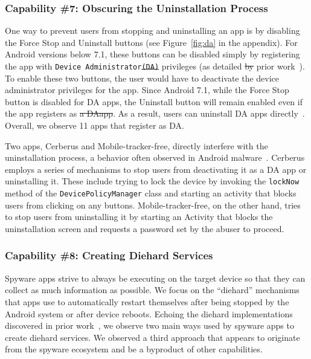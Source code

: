 \documentclass[sigconf,balance=false]{acmart}
\newcommand{\alex}[1]{\textcolor{chicagomaroon}{\noindent[AL: #1]}}
\newcommand{\damon}[1]{\textcolor{blue}{\noindent[DM: #1]}}
\newcommand{\alex}[1]{}
\newcommand{\damon}[1]{}
\providecommand{\DIFadd}[1]{{\protect\color{blue}\uwave{#1}}} %
\providecommand{\DIFdel}[1]{{\protect\color{red}\sout{#1}}}                      %
\providecommand{\DIFaddbegin}{} %
\providecommand{\DIFaddend}{} %
\providecommand{\DIFdelbegin}{} %
\providecommand{\DIFdelend}{} %
\newcommand{\DIFscaledelfig}{0.5}
\newlength{\DIFdelgraphicswidth} %
\newlength{\DIFdelgraphicsheight} %
\newcommand{\DIFaddincludegraphics}[2][]{{\color{blue}\fbox{\DIFOincludegraphics[#1]{#2}}}} %
\newcommand{\DIFdelincludegraphics}[2][]{%
\sbox{\DIFdelgraphicsbox}{\DIFOincludegraphics[#1]{#2}}%
\settoboxwidth{\DIFdelgraphicswidth}{\DIFdelgraphicsbox} %
\settoboxtotalheight{\DIFdelgraphicsheight}{\DIFdelgraphicsbox} %
\scalebox{\DIFscaledelfig}{%
\parbox[b]{\DIFdelgraphicswidth}{\usebox{\DIFdelgraphicsbox}\\[-\baselineskip] \rule{\DIFdelgraphicswidth}{0em}}\llap{\resizebox{\DIFdelgraphicswidth}{\DIFdelgraphicsheight}{%
\setlength{\unitlength}{\DIFdelgraphicswidth}%
\begin{picture}(1,1)%
\thicklines\linethickness{2pt} %
{\color[rgb]{1,0,0}\put(0,0){\framebox(1,1){}}}%
{\color[rgb]{1,0,0}\put(0,0){\line( 1,1){1}}}%
{\color[rgb]{1,0,0}\put(0,1){\line(1,-1){1}}}%
\end{picture}%
}\hspace*{3pt}}} %
} %
\DeclareRobustCommand{\DIFaddbegin}{\DIFOaddbegin \let\includegraphics\DIFaddincludegraphics} %
\DeclareRobustCommand{\DIFaddend}{\DIFOaddend \let\includegraphics\DIFOincludegraphics} %
\DeclareRobustCommand{\DIFdelbegin}{\DIFOdelbegin \let\includegraphics\DIFdelincludegraphics} %
\DeclareRobustCommand{\DIFdelend}{\DIFOaddend \let\includegraphics\DIFOincludegraphics} %
\begin{document}

\subsubsection*{Capability \#7: Obscuring the Uninstallation Process}

One way to prevent users from stopping and uninstalling an app is by
disabling the Force Stop and Uninstall buttons (see
Figure~\ref{fig:da} in the appendix).  For Android versions below 7.1,
these buttons can be disabled simply by registering the app with
\texttt{Device Administrator\DIFdelbegin \DIFdel{(DA)}\DIFdelend } \DIFaddbegin \DIFadd{(DA) }\DIFaddend privileges (as detailed \DIFdelbegin \DIFdel{by }\DIFdelend \DIFaddbegin \DIFadd{in }\DIFaddend prior
work~\cite{shan2019device}). To enable these two buttons, the user
would have to deactivate the device administrator privileges for the
app.
%
Since Android 7.1, while the Force Stop button is disabled for DA
apps, the Uninstall button will remain enabled even if the app
registers as \DIFdelbegin \DIFdel{a DAapp}\DIFdelend \DIFaddbegin \DIFadd{DA}\DIFaddend .  As a result, users can uninstall DA apps
directly~\cite{shan2019device}. Overall, we observe 11 apps that
register as DA.

Two apps, Cerberus and Mobile-tracker-free, directly interfere with the
uninstallation process, a behavior often observed in Android
malware~\cite{shan2019device,aljarrah2016maintaining}. Cerberus employs a series
of mechanisms to stop users from deactivating it as a DA app or
uninstalling it. These include trying to lock the device by invoking the
\texttt{lockNow} method of the \texttt{DevicePolicyManager} class and starting
an activity that blocks users from clicking on any buttons. Mobile-tracker-free,
on the other hand, tries to stop users from uninstalling it by starting an
Activity that blocks the uninstallation screen and requests a password set
by the abuser to proceed.

\subsubsection*{Capability \#8: Creating Diehard Services}
%
Spyware apps strive to always be executing on the target device so
that they can collect as much information as possible.  We focus on
the ``diehard'' mechanisms that apps use to automatically restart
themselves after being stopped by the Android system \DIFaddbegin \DIFadd{(e.g., due to low memory) }\DIFaddend or after device
reboots. Echoing the diehard implementations discovered in prior
work~\cite{shao2019lightweight,zhou2020demystifying}, we observe two
main ways used by spyware apps to create diehard services. We observed
a third approach that appears to originate from the spyware ecosystem
and be a byproduct of other capabilities.
\end{document}
